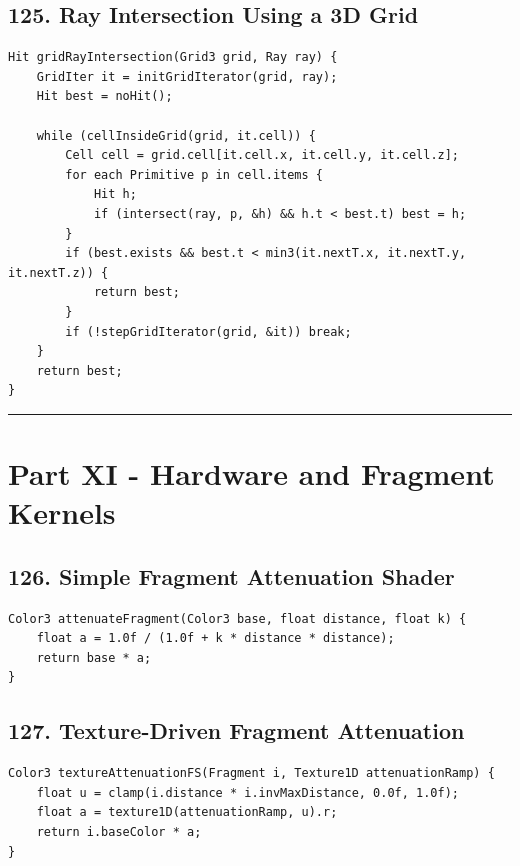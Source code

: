 \documentclass[10pt,letterpaper]{article}
\begin{document}
\subsection{125. Ray Intersection Using a 3D Grid}

\begin{verbatim}
Hit gridRayIntersection(Grid3 grid, Ray ray) {
    GridIter it = initGridIterator(grid, ray);
    Hit best = noHit();

    while (cellInsideGrid(grid, it.cell)) {
        Cell cell = grid.cell[it.cell.x, it.cell.y, it.cell.z];
        for each Primitive p in cell.items {
            Hit h;
            if (intersect(ray, p, &h) && h.t < best.t) best = h;
        }
        if (best.exists && best.t < min3(it.nextT.x, it.nextT.y, it.nextT.z)) {
            return best;
        }
        if (!stepGridIterator(grid, &it)) break;
    }
    return best;
}
\end{verbatim}

\medskip\hrule\medskip

\clearpage
\section{Part XI - Hardware and Fragment Kernels}

\subsection{126. Simple Fragment Attenuation Shader}

\begin{verbatim}
Color3 attenuateFragment(Color3 base, float distance, float k) {
    float a = 1.0f / (1.0f + k * distance * distance);
    return base * a;
}
\end{verbatim}

\subsection{127. Texture-Driven Fragment Attenuation}

\begin{verbatim}
Color3 textureAttenuationFS(Fragment i, Texture1D attenuationRamp) {
    float u = clamp(i.distance * i.invMaxDistance, 0.0f, 1.0f);
    float a = texture1D(attenuationRamp, u).r;
    return i.baseColor * a;
}
\end{verbatim}

\end{document}
